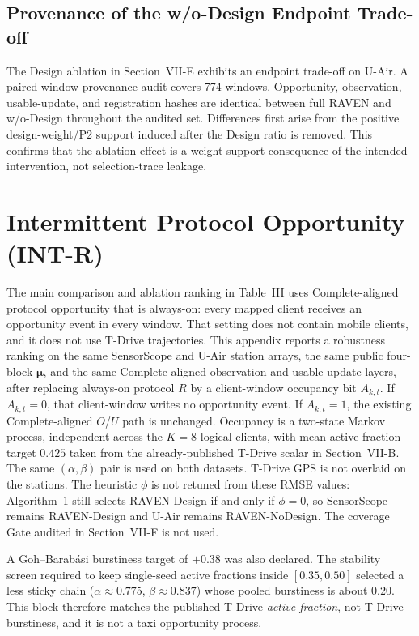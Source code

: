 \subsection{Provenance of the w/o-Design Endpoint Trade-off}
\label{app:design_provenance}

The Design ablation in Section~\mbox {VII-E} exhibits an endpoint
trade-off on U-Air.  A paired-window provenance audit covers
774 windows.  Opportunity, observation, usable-update, and
registration hashes are identical between full RAVEN and w/o-Design throughout
the audited set.  Differences first arise from the positive design-weight/P2
support induced after the Design ratio is removed.  This confirms that the
ablation effect is a weight-support consequence of the intended intervention,
not selection-trace leakage.

\section{Intermittent Protocol Opportunity (INT-R)}
\label{app:int_r}

The main comparison and ablation ranking in Table~III uses
Complete-aligned protocol opportunity that is always-on: every mapped
client receives an opportunity event in every window.  That setting does
not contain mobile clients, and it does not use T-Drive trajectories.
This appendix reports a robustness ranking on the same SensorScope and
U-Air station arrays, the same public four-block $\boldsymbol\mu$, and the
same Complete-aligned observation and usable-update layers, after replacing
always-on protocol $R$ by a client-window occupancy bit $A_{k,t}$.
If $A_{k,t}=0$, that client-window writes no opportunity event.  If
$A_{k,t}=1$, the existing Complete-aligned $O$/$U$ path is unchanged.
Occupancy is a two-state Markov process, independent across the $K=8$
logical clients, with mean active-fraction target $0.425$ taken from the
already-published T-Drive scalar in Section~\mbox {VII-B}.  The
same $(\alpha,\beta)$ pair is used on both datasets.  T-Drive GPS is not
overlaid on the stations.  The heuristic $\phi$ is not retuned from
these RMSE values: Algorithm~1 still selects RAVEN-Design
if and only if $\phi=0$, so SensorScope remains RAVEN-Design and U-Air remains
RAVEN-NoDesign.
The coverage Gate audited in Section~\mbox {VII-F} is not used.

A Goh--Barab\'asi burstiness target of $+0.38$ was also declared.  The
stability screen required to keep single-seed active fractions inside
$[0.35,0.50]$ selected a less sticky chain
($\alpha\approx0.775$, $\beta\approx0.837$) whose pooled burstiness is
about $0.20$.  This block therefore matches the published T-Drive
\emph{active fraction}, not T-Drive burstiness, and it is not a taxi
opportunity process.

